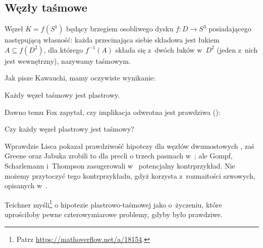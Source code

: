 
\subsection{Węzły taśmowe}
\begin{definition}
    Węzeł $K = f(S^1)$ będący brzegiem osobliwego dysku $f \colon D \to S^3$ posiadającego następującą własność: każda przecinająca siebie składowa jest łukiem $A \subseteq f(D^2)$, dla którego $f^{-1}(A)$ składa się z~dwóch łuków w~$D^2$ (jeden z~nich jest wewnętrzny), nazywamy taśmowym.
\end{definition}

Jak pisze Kawauchi, mamy oczywiste wynikanie:

\begin{proposition}
%
    Każdy węzeł taśmowy jest plastrowy.
\end{proposition}

Dawno temu Fox zapytał, czy implikacja odwrotna jest prawdziwa (\cite[problem 1.33]{kirby78}):

\begin{conjecture}
    Czy każdy węzeł plastrowy jest taśmowy?
\end{conjecture}

Wprawdzie Lisca pokazał prawdziwość hipotezy dla węzłów dwumostowych \cite{lisca07},
%
zaś Greene oraz Jabuka zrobili to dla precli o trzech pasmach w~\cite{greene11};
%
ale Gompf, Scharlemann i~Thompson zasugerowali w~\cite{gompf10} potencjalny kontrprzykład.
%
Nie możemy przytoczyć tego kontrprzykładu, gdyż korzysta z~rozmaitości szwowych, opisanych w~\cite[s. 53-59]{kawauchi96}.

Teichner myśli\footnote{Patrz \url{https://mathoverflow.net/a/18154}.} o hipotezie plastrowo-taśmowej jako o~życzeniu, które uprościłoby pewne czterowymiarowe problemy, gdyby było prawdziwe.



